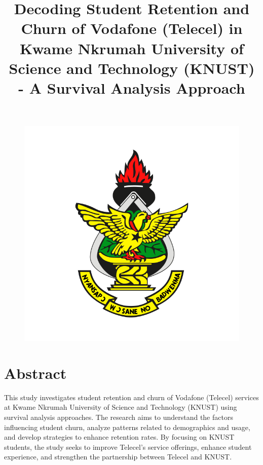 \documentclass[12pt]{report}
\begin{document}
\begin{figure}[ht]
    \centering
    \includegraphics[width=\textwidth]{logo.png}
\end{figure}

\title{Decoding Student Retention and Churn of Vodafone (Telecel) in Kwame Nkrumah University of Science and Technology (KNUST) - A Survival Analysis Approach}
\author{}
\date{}
\maketitle

\newpage
\chapter*{Abstract}
This study investigates student retention and churn of Vodafone (Telecel) services at Kwame Nkrumah University of Science and Technology (KNUST) using survival analysis approaches. The research aims to understand the factors influencing student churn, analyze patterns related to demographics and usage, and develop strategies to enhance retention rates. By focusing on KNUST students, the study seeks to improve Telecel's service offerings, enhance student experience, and strengthen the partnership between Telecel and KNUST.
\end{document}
